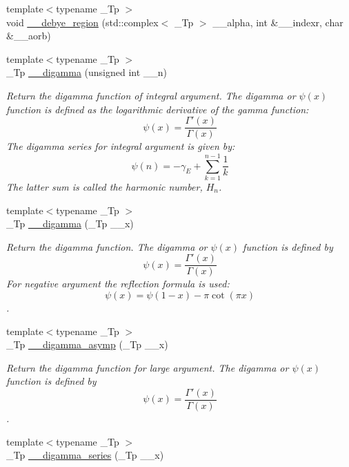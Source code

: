 \begin{DoxyCompactItemize}
\item 
{\footnotesize template$<$typename \+\_\+\+Tp $>$ }\\void \hyperlink{namespacestd_1_1____detail_a3212c0a136417e862f2ed8e9684e053c}{\+\_\+\+\_\+debye\+\_\+region} (std\+::complex$<$ \+\_\+\+Tp $>$ \+\_\+\+\_\+alpha, int \&\+\_\+\+\_\+indexr, char \&\+\_\+\+\_\+aorb)
\item 
{\footnotesize template$<$typename \+\_\+\+Tp $>$ }\\\+\_\+\+Tp \hyperlink{namespacestd_1_1____detail_a8ae60de1f8adf628c0b7f243231b98c3}{\+\_\+\+\_\+digamma} (unsigned int \+\_\+\+\_\+n)
\begin{DoxyCompactList}\small\item\em Return the digamma function of integral argument. The digamma or $ \psi(x) $ function is defined as the logarithmic derivative of the gamma function\+: \[ \psi(x) = \frac{\Gamma'(x)}{\Gamma(x)} \] The digamma series for integral argument is given by\+: \[ \psi(n) = -\gamma_E + \sum_{k=1}^{n-1} \frac{1}{k} \] The latter sum is called the harmonic number, $ H_n $. \end{DoxyCompactList}\item 
{\footnotesize template$<$typename \+\_\+\+Tp $>$ }\\\+\_\+\+Tp \hyperlink{namespacestd_1_1____detail_af83cdc6dd8c24e164b8c71491c4b0080}{\+\_\+\+\_\+digamma} (\+\_\+\+Tp \+\_\+\+\_\+x)
\begin{DoxyCompactList}\small\item\em Return the digamma function. The digamma or $ \psi(x) $ function is defined by \[ \psi(x) = \frac{\Gamma'(x)}{\Gamma(x)} \] For negative argument the reflection formula is used\+: \[ \psi(x) = \psi(1-x) - \pi \cot(\pi x) \]. \end{DoxyCompactList}\item 
{\footnotesize template$<$typename \+\_\+\+Tp $>$ }\\\+\_\+\+Tp \hyperlink{namespacestd_1_1____detail_a5264ad32c92b701acb90b543a1a96521}{\+\_\+\+\_\+digamma\+\_\+asymp} (\+\_\+\+Tp \+\_\+\+\_\+x)
\begin{DoxyCompactList}\small\item\em Return the digamma function for large argument. The digamma or $ \psi(x) $ function is defined by \[ \psi(x) = \frac{\Gamma'(x)}{\Gamma(x)} \]. \end{DoxyCompactList}\item 
{\footnotesize template$<$typename \+\_\+\+Tp $>$ }\\\+\_\+\+Tp \hyperlink{namespacestd_1_1____detail_ae9d54f73a3e05c2b242e992a0a93d5de}{\+\_\+\+\_\+digamma\+\_\+series} (\+\_\+\+Tp \+\_\+\+\_\+x)

\end{DoxyCompactItemize}
